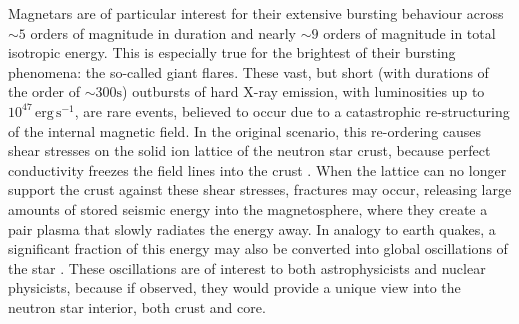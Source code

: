 \documentclass[numberedappendix]{emulateapj}
\begin{document}

Magnetars are of particular interest for their extensive bursting behaviour across $\sim 5$ orders of magnitude in duration and nearly $\sim 9$ orders of magnitude in total isotropic energy. This is especially true for the brightest of their bursting phenomena: the so-called giant flares. These vast, but short (with durations of the order of $\sim 300\mathrm{s}$) outbursts of hard X-ray emission, with luminosities up to $10^{47}\,\mathrm{erg}\, \mathrm{s}^{-1}$, are rare events, believed to occur due to a catastrophic re-structuring of the internal magnetic field. In the original scenario, this re-ordering causes shear stresses on the solid ion lattice of the neutron star crust, because perfect conductivity freezes the field lines into the crust \citep{thompson1995}. When the lattice can no longer support the crust against these shear stresses, fractures may occur, releasing large amounts of stored seismic energy into the magnetosphere, where they create a pair plasma that slowly radiates the energy away. In analogy to earth quakes, a significant fraction of this energy may also be converted into global oscillations of the star \citep{duncan1998}. These oscillations are of interest to both astrophysicists and nuclear physicists, because if observed, they would provide a unique view into the neutron star interior, both crust and core. 
\end{document}

